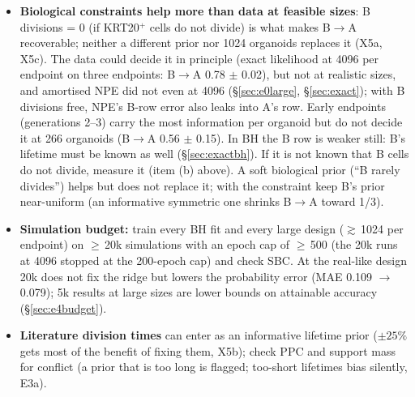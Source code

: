 \documentclass[10pt,a4paper]{article}
\begin{document}
\begin{itemize}
\begin{enumerate}[label=(\alph*)]
  \item \emph{mis-typing rate} (2D vs 3D comparison), above all how often LGR5$^+$ cells are called KRT20$^+$ (the harmful direction, \S\ref{sec:e2asym}), and pass it to the model as an asymmetric confusion: ignored, it is tolerable only up to $e \approx 0.05$ once posteriors are as narrow as in GW;
  \item \emph{cell-cycle variability}: only whether CV is $<0.5$ or near-exponential;
  \item \emph{founder type} and \emph{quiescence} (e.g.\ Ki67) if they matter biologically --- the counts cannot provide them;
  \item \emph{apoptosis} only if death rates are to be fixed; otherwise keep them free (a value too high biases B$\to$A; in BH silently).
  \end{enumerate}
\item \textbf{Biological constraints help more than data at feasible sizes}: B divisions = 0 (if KRT20$^+$ cells do not divide) is what makes B$\to$A recoverable; neither a different prior nor 1024 organoids replaces it (X5a, X5c). The data could decide it in principle (exact likelihood at 4096 per endpoint on three endpoints: B$\to$A 0.78 $\pm$ 0.02), but not at realistic sizes, and amortised NPE did not even at 4096 (\S\ref{sec:e0large}, \S\ref{sec:exact}); with B divisions free, NPE's B-row error also leaks into A's row. Early endpoints (generations 2--3) carry the most information per organoid but do not decide it at 266 organoids (B$\to$A 0.56 $\pm$ 0.15). In BH the B row is weaker still: B's lifetime must be known as well (\S\ref{sec:exactbh}). If it is not known that B cells do not divide, measure it (item (b) above). A soft biological prior (``B rarely divides'') helps but does not replace it; with the constraint keep B's prior near-uniform (an informative symmetric one shrinks B$\to$A toward 1/3).
\item \textbf{Simulation budget:} train every BH fit and every large design ($\gtrsim$\,1024 per endpoint) on $\ge$\,20k simulations with an epoch cap of $\ge$\,500 (the 20k runs at 4096 stopped at the 200-epoch cap) and check SBC. At the real-like design 20k does not fix the ridge but lowers the probability error (MAE 0.109 $\to$ 0.079); 5k results at large sizes are lower bounds on attainable accuracy (\S\ref{sec:e4budget}).
\item \textbf{Literature division times} can enter as an informative lifetime prior ($\pm 25\%$ gets most of the benefit of fixing them, X5b); check PPC and support mass for conflict (a prior that is too long is flagged; too-short lifetimes bias silently, E3a).

\end{itemize}
\end{document}
